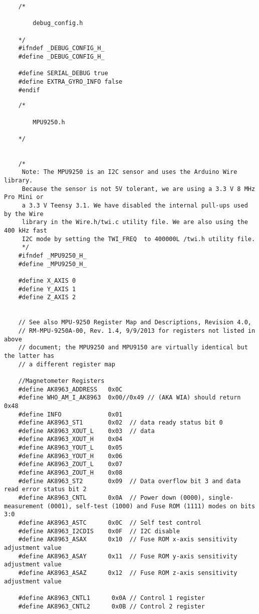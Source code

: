	\begin{lstlisting}
	/*

		debug_config.h

	*/
	#ifndef _DEBUG_CONFIG_H_
	#define _DEBUG_CONFIG_H_

	#define SERIAL_DEBUG true
	#define EXTRA_GYRO_INFO false
	#endif

	\end{lstlisting}

	\begin{lstlisting}
	/*

		MPU9250.h

	*/


	/*
	 Note: The MPU9250 is an I2C sensor and uses the Arduino Wire library.
	 Because the sensor is not 5V tolerant, we are using a 3.3 V 8 MHz Pro Mini or
	 a 3.3 V Teensy 3.1. We have disabled the internal pull-ups used by the Wire
	 library in the Wire.h/twi.c utility file. We are also using the 400 kHz fast
	 I2C mode by setting the TWI_FREQ  to 400000L /twi.h utility file.
	 */
	#ifndef _MPU9250_H_
	#define _MPU9250_H_

	#define X_AXIS 0
	#define Y_AXIS 1
	#define Z_AXIS 2


	// See also MPU-9250 Register Map and Descriptions, Revision 4.0,
	// RM-MPU-9250A-00, Rev. 1.4, 9/9/2013 for registers not listed in above
	// document; the MPU9250 and MPU9150 are virtually identical but the latter has
	// a different register map

	//Magnetometer Registers
	#define AK8963_ADDRESS   0x0C
	#define WHO_AM_I_AK8963  0x00//0x49 // (AKA WIA) should return 0x48
	#define INFO             0x01
	#define AK8963_ST1       0x02  // data ready status bit 0
	#define AK8963_XOUT_L    0x03  // data
	#define AK8963_XOUT_H    0x04
	#define AK8963_YOUT_L    0x05
	#define AK8963_YOUT_H    0x06
	#define AK8963_ZOUT_L    0x07
	#define AK8963_ZOUT_H    0x08
	#define AK8963_ST2       0x09  // Data overflow bit 3 and data read error status bit 2
	#define AK8963_CNTL      0x0A  // Power down (0000), single-measurement (0001), self-test (1000) and Fuse ROM (1111) modes on bits 3:0
	#define AK8963_ASTC      0x0C  // Self test control
	#define AK8963_I2CDIS    0x0F  // I2C disable
	#define AK8963_ASAX      0x10  // Fuse ROM x-axis sensitivity adjustment value
	#define AK8963_ASAY      0x11  // Fuse ROM y-axis sensitivity adjustment value
	#define AK8963_ASAZ      0x12  // Fuse ROM z-axis sensitivity adjustment value

	#define AK8963_CNTL1      0x0A // Control 1 register
	#define AK8963_CNTL2      0x0B // Control 2 register


\end{lstlisting}
